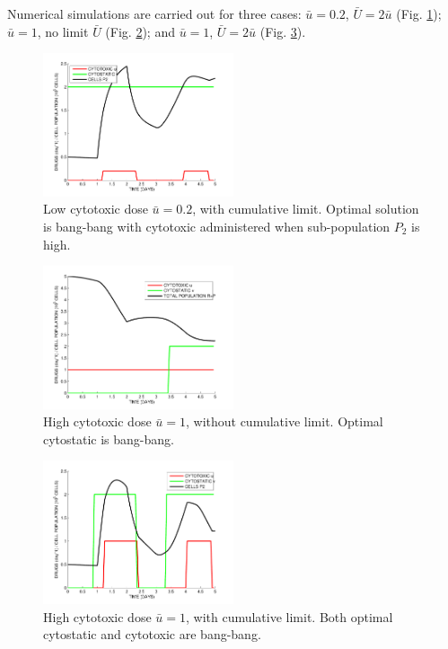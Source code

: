 \documentclass[a4paper]{article}
\begin{document}
\noindent Numerical simulations are carried out for three cases: $\bar{u}=0.2$, $\bar{U}=2\bar{u}$ (Fig. \ref{fig:fig3});
$\bar{u}=1$, no limit $\bar{U}$ (Fig. \ref{fig:fig4}); and $\bar{u}=1$, $\bar{U}=2\bar{u}$ (Fig. \ref{fig:fig5}).

\begin{figure}[h!]
 \begin{center}
  \includegraphics[width=0.5\textwidth]{Fig3}
  \caption{\label{fig:fig3} Low cytotoxic dose $\bar{u}=0.2$, with cumulative limit. Optimal solution is bang-bang with cytotoxic administered when sub-population $P_2$ is high.}
  \end{center}
\end{figure}

\begin{figure}[h!]
 \begin{center}
  \includegraphics[width=0.5\textwidth]{Fig4}
  \caption{\label{fig:fig4} High cytotoxic dose $\bar{u}=1$, without cumulative limit. Optimal cytostatic is bang-bang.}
  \end{center}
\end{figure}

\begin{figure}[h!]
 \begin{center}
  \includegraphics[width=0.5\textwidth]{Fig5}
  \caption{\label{fig:fig5} High cytotoxic dose $\bar{u}=1$, with cumulative limit. Both optimal cytostatic and cytotoxic are bang-bang.}
  \end{center}
\end{figure}



\end{document}
